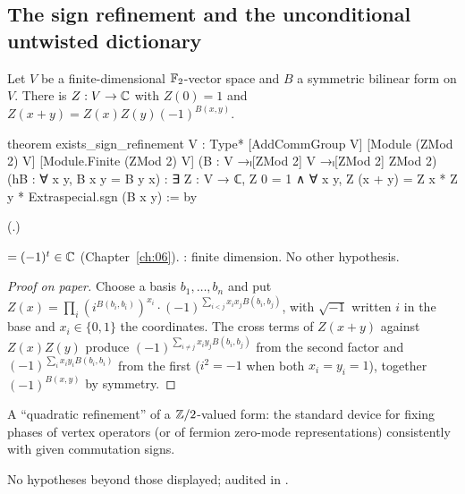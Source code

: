 \subsection{The sign refinement and the unconditional untwisted dictionary}

\begin{theorem}\label{ch21:thm:signref}
Let $V$ be a finite-dimensional $\mathbb{F}_2$-vector space and $B$ a symmetric bilinear form on $V$.  There is
$Z:V\to{\mathbb{C}}$ with $Z(0)=1$ and $Z(x+y)=Z(x)Z(y)(-1)^{B(x,y)}$.
\end{theorem}
\begin{leancode}
theorem exists_sign_refinement {V : Type*} [AddCommGroup V] [Module (ZMod 2) V]
    [Module.Finite (ZMod 2) V] (B : V →ₗ[ZMod 2] V →ₗ[ZMod 2] ZMod 2)
    (hB : ∀ x y, B x y = B y x) :
    ∃ Z : V → ℂ, Z 0 = 1 ∧ ∀ x y, Z (x + y) = Z x * Z y * Extraspecial.sgn (B x y) := by
\end{leancode}
(.)
\begin{dictionary}
 $=(-1)^t\in{\mathbb{C}}$ (Chapter~\ref{ch:06}).  :
finite dimension.  No other hypothesis.
\end{dictionary}
\begin{proof}[Proof on paper]
Choose a basis $b_1,\dots,b_n$ and put
$Z(x)=\prod_i(i^{B(b_i,b_i)})^{x_i}\cdot(-1)^{\sum_{i<j}x_ix_jB(b_i,b_j)}$, with $\sqrt{-1}$ written $i$
in the base and $x_i\in\{0,1\}$ the coordinates.  The cross terms of $Z(x+y)$ against $Z(x)Z(y)$ produce
$(-1)^{\sum_{i\ne j}x_iy_jB(b_i,b_j)}$ from the second factor and $(-1)^{\sum_ix_iy_iB(b_i,b_i)}$ from
the first ($i^{2}=-1$ when both $x_i=y_i=1$), together $(-1)^{B(x,y)}$ by symmetry.
\end{proof}
\begin{physics}
A ``quadratic refinement'' of a ${\mathbb{Z}}/2$-valued form: the standard device for fixing phases of vertex
operators (or of fermion zero-mode representations) consistently with given commutation signs.
\end{physics}
\begin{status}
No hypotheses beyond those displayed; audited in .
\end{status}


